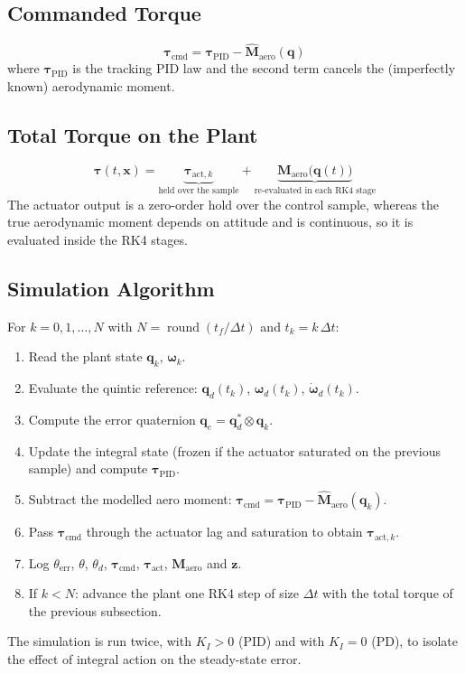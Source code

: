 \documentclass[11pt, a4paper]{article}
\newcommand{\vect}[1]{\boldsymbol{#1}}
\newcommand{\w}{\vect{\omega}}
\begin{document}
\subsection{Commanded Torque}
\begin{equation}
\vect{\tau}_{\text{cmd}} = \vect{\tau}_{\text{PID}} - \hat{\vect{M}}_{\text{aero}}(\vect{q})
\end{equation}
where $\vect{\tau}_{\text{PID}}$ is the tracking PID law and the second term cancels the (imperfectly known) aerodynamic moment.

\subsection{Total Torque on the Plant}
\begin{equation}
\vect{\tau}(t, \vect{x}) = \underbrace{\vect{\tau}_{\text{act}, k}}_{\text{held over the sample}} + \underbrace{\vect{M}_{\text{aero}}\big( \vect{q}(t) \big)}_{\text{re-evaluated in each RK4 stage}}
\end{equation}
The actuator output is a zero-order hold over the control sample, whereas the true aerodynamic moment depends on attitude and is continuous, so it is evaluated inside the RK4 stages.

\subsection{Simulation Algorithm}
For $k = 0, 1, \dots, N$ with $N = \operatorname{round}(t_f / \Delta t)$ and $t_k = k\, \Delta t$:
\begin{enumerate}
    \item Read the plant state $\vect{q}_k$, $\w_k$.
    \item Evaluate the quintic reference: $\vect{q}_d(t_k)$, $\w_d(t_k)$, $\dot{\w}_d(t_k)$.
    \item Compute the error quaternion $\vect{q}_e = \vect{q}_d^{*} \otimes \vect{q}_k$.
    \item Update the integral state (frozen if the actuator saturated on the previous sample) and compute $\vect{\tau}_{\text{PID}}$.
    \item Subtract the modelled aero moment: $\vect{\tau}_{\text{cmd}} = \vect{\tau}_{\text{PID}} - \hat{\vect{M}}_{\text{aero}}(\vect{q}_k)$.
    \item Pass $\vect{\tau}_{\text{cmd}}$ through the actuator lag and saturation to obtain $\vect{\tau}_{\text{act}, k}$.
    \item Log $\theta_{\text{err}}$, $\theta$, $\theta_d$, $\vect{\tau}_{\text{cmd}}$, $\vect{\tau}_{\text{act}}$, $\vect{M}_{\text{aero}}$ and $\vect{z}$.
    \item If $k < N$: advance the plant one RK4 step of size $\Delta t$ with the total torque of the previous subsection.
\end{enumerate}
The simulation is run twice, with $K_I > 0$ (PID) and with $K_I = 0$ (PD), to isolate the effect of integral action on the steady-state error.
\end{document}
